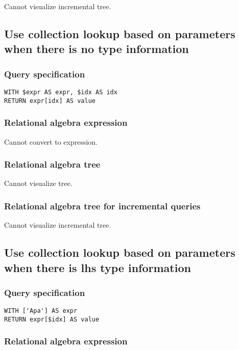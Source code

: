 Cannot visualize incremental tree.

\subsection{Use collection lookup based on parameters when there is no type information}

\subsubsection*{Query specification}

\begin{lstlisting}
WITH $expr AS expr, $idx AS idx
RETURN expr[idx] AS value
\end{lstlisting}

\subsubsection*{Relational algebra expression}

Cannot convert to expression.

\subsubsection*{Relational algebra tree}

Cannot visualize tree.

\subsubsection*{Relational algebra tree for incremental queries}

Cannot visualize incremental tree.

\subsection{Use collection lookup based on parameters when there is lhs type information}

\subsubsection*{Query specification}

\begin{lstlisting}
WITH ['Apa'] AS expr
RETURN expr[$idx] AS value
\end{lstlisting}

\subsubsection*{Relational algebra expression}


